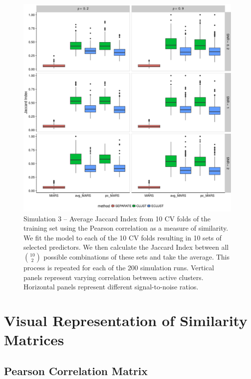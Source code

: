 \begin{figure}[H]
	\centering
	\includegraphics[scale=0.6, keepaspectratio]{./figs/hydra/results/figures/sim3-sept27/jacc_Correlation_sim3.png}
	\caption{Simulation 3 -- Average Jaccard Index from 10 CV folds of the training set using the Pearson correlation as a measure of similarity. We fit the model to each of the 10 CV folds resulting in 10 sets of selected predictors. We then calculate the Jaccard Index between all $\binom{10}{2}$ possible combinations of these sets and take the average. This process is repeated for each of the 200 simulation runs. Vertical panels represent varying correlation between active clusters. Horizontal panels represent different signal-to-noise ratios.}
	\label{fig:jacc_Correlation_sim3}
\end{figure}





\section{Visual Representation of Similarity Matrices}\label{ap:similaritymatrices}


\subsection*{Pearson Correlation Matrix}

